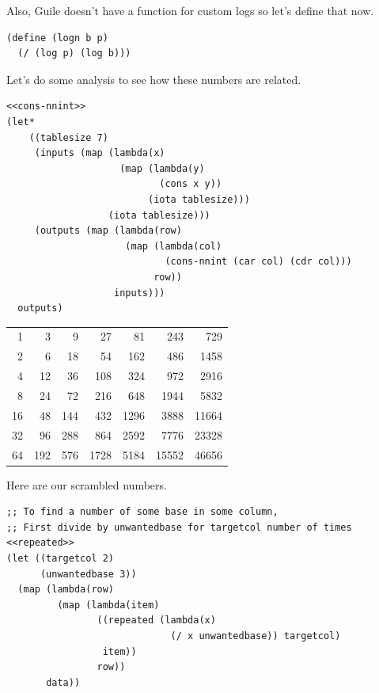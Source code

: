 \documentclass[final,fleqn,titlepage,twoside]{article}
\begin{document}
Also, Guile doesn't have a function for custom logs so let's define that now.
\begin{verbatim}
(define (logn b p)
  (/ (log p) (log b)))
\end{verbatim}

Let's do some analysis to see how these numbers are related.
\begin{verbatim}
<<cons-nnint>>
(let*
    ((tablesize 7)
     (inputs (map (lambda(x)
                    (map (lambda(y)
                           (cons x y))
                         (iota tablesize)))
                  (iota tablesize)))
     (outputs (map (lambda(row)
                     (map (lambda(col)
                            (cons-nnint (car col) (cdr col)))
                          row))
                   inputs)))
  outputs)
\end{verbatim}

\begin{center}
\begin{tabular}{rrrrrrr}
1 & 3 & 9 & 27 & 81 & 243 & 729\\[0pt]
2 & 6 & 18 & 54 & 162 & 486 & 1458\\[0pt]
4 & 12 & 36 & 108 & 324 & 972 & 2916\\[0pt]
8 & 24 & 72 & 216 & 648 & 1944 & 5832\\[0pt]
16 & 48 & 144 & 432 & 1296 & 3888 & 11664\\[0pt]
32 & 96 & 288 & 864 & 2592 & 7776 & 23328\\[0pt]
64 & 192 & 576 & 1728 & 5184 & 15552 & 46656\\[0pt]
\end{tabular}
\end{center}

Here are our scrambled numbers. 

\begin{verbatim}
;; To find a number of some base in some column,
;; First divide by unwantedbase for targetcol number of times
<<repeated>>
(let ((targetcol 2)
      (unwantedbase 3))
  (map (lambda(row)
         (map (lambda(item)
                ((repeated (lambda(x) 
                             (/ x unwantedbase)) targetcol)
                 item))
                row))
       data))
\end{verbatim}
\end{document}
